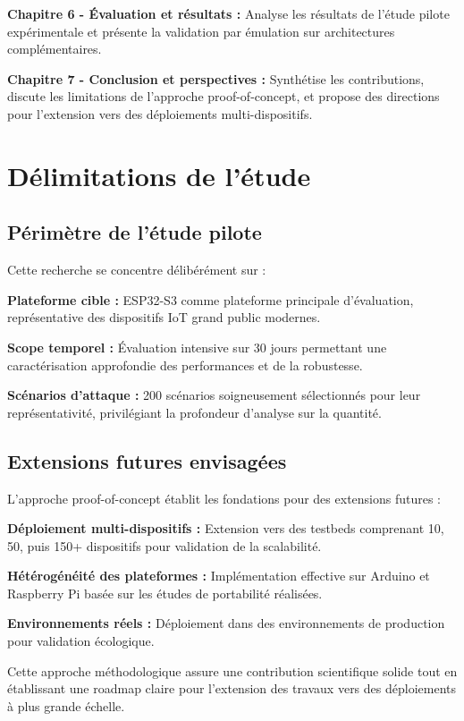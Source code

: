 \textbf{Chapitre 6 - Évaluation et résultats :} Analyse les résultats de l'étude pilote expérimentale et présente la validation par émulation sur architectures complémentaires.

\textbf{Chapitre 7 - Conclusion et perspectives :} Synthétise les contributions, discute les limitations de l'approche proof-of-concept, et propose des directions pour l'extension vers des déploiements multi-dispositifs.

\section{Délimitations de l'étude}

\subsection{Périmètre de l'étude pilote}

Cette recherche se concentre délibérément sur :

\textbf{Plateforme cible :} ESP32-S3 comme plateforme principale d'évaluation, représentative des dispositifs IoT grand public modernes.

\textbf{Scope temporel :} Évaluation intensive sur 30 jours permettant une caractérisation approfondie des performances et de la robustesse.

\textbf{Scénarios d'attaque :} 200 scénarios soigneusement sélectionnés pour leur représentativité, privilégiant la profondeur d'analyse sur la quantité.

\subsection{Extensions futures envisagées}

L'approche proof-of-concept établit les fondations pour des extensions futures :

\textbf{Déploiement multi-dispositifs :} Extension vers des testbeds comprenant 10, 50, puis 150+ dispositifs pour validation de la scalabilité.

\textbf{Hétérogénéité des plateformes :} Implémentation effective sur Arduino et Raspberry Pi basée sur les études de portabilité réalisées.

\textbf{Environnements réels :} Déploiement dans des environnements de production pour validation écologique.

Cette approche méthodologique assure une contribution scientifique solide tout en établissant une roadmap claire pour l'extension des travaux vers des déploiements à plus grande échelle.